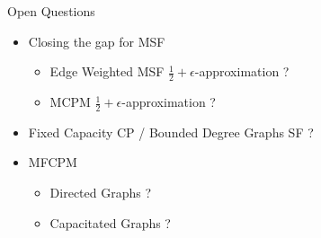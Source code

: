 \begin{frame}{Open Questions}
\begin{itemize}[<+->]
  \item Closing the gap for MSF   
	\begin{itemize}[<+->]
	  \item Edge Weighted MSF $\frac{1}{2} + \epsilon$-approximation ?
	  \item MCPM $\frac{1}{2} + \epsilon$-approximation ?
	\end{itemize}
  \item Fixed Capacity CP / Bounded Degree Graphs SF ? 
  \item MFCPM  
	\begin{itemize}[<+->]
	  \item Directed Graphs ?
	  \item Capacitated Graphs ?
	\end{itemize}
\end{itemize}
\end{frame}